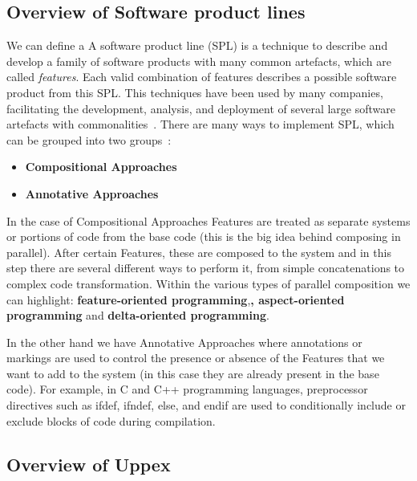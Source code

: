 \subsection*{Overview of Software product lines}

We can define a
A software product line (SPL) %
is a technique to describe and develop a family of software products with many common artefacts, which are called \emph{features}. 
Each valid combination of features describes a possible software product from this SPL.
This techniques have been used by many companies, facilitating the development, analysis, and deployment of several large software artefacts with commonalities~\cite{Pohl2018}.
%
There are many ways to implement SPL, which can be grouped %
into two groups~\cite{Pohl2018}:

\begin{itemize}
    \item \textbf{Compositional Approaches}
    \item \textbf{Annotative Approaches}
\end{itemize}

In the case of Compositional Approaches Features are treated as separate systems or portions of code from the base code (this is the big idea behind composing in parallel). After certain Features, these are composed to the system and in this step there are several different ways to perform it, from simple concatenations to complex code transformation. Within the various types of parallel composition we can highlight: \textbf{feature-oriented programming},\textbf{, aspect-oriented programming} and \textbf{ delta-oriented programming}.

In the other hand we have Annotative Approaches where annotations or markings are used to control the presence or absence of the Features that we want to add to the system (in this case they are already present in the base code). For example, in C and C++ programming languages, preprocessor directives such as ifdef, ifndef, else, and endif are used to conditionally include or exclude blocks of code during compilation.


\subsection*{Overview of Uppex}

